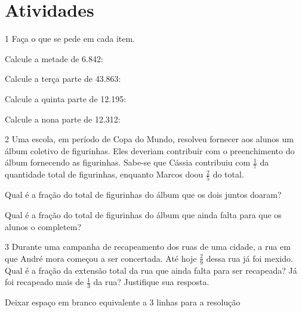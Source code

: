 \section*{Atividades}

\num{1} Faça o que se pede em cada item.

\begin{escolha}
\item
Calcule a metade de 6.842: 

\item
Calcule a terça parte de 43.863: 

\item
Calcule a quinta parte de 12.195: 

\item
Calcule a nona parte de 12.312: 

\end{escolha}

\num{2} Uma escola, em período de Copa do Mundo, resolveu fornecer aos alunos um
álbum coletivo de figurinhas. Eles deveriam contribuir com o
preenchimento do álbum fornecendo as figurinhas. Sabe-se que Cássia
contribuiu com $\frac{1}{7}$ da quantidade total de figurinhas, enquanto Marcos
doou $\frac{2}{5}$ do total.

\begin{escolha}
\item
  Qual é a fração do total de figurinhas do álbum que os dois juntos doaram?
\item{}
\bigskip

\item
  Qual é a fração do total de figurinhas do álbum que ainda falta para que os alunos o completem?
\item{}
\bigskip
\end{escolha}


\num{3} Durante uma campanha de recapeamento dos ruas de uma cidade, a rua em
que André mora começou a ser concertada. Até hoje $\frac{2}{9}$ dessa rua já foi mexido.
Qual é a fração da extensão total da rua que ainda falta para ser
recapeada? Já foi recapeado mais de $\frac{1}{3}$ da rua? Justifique sua resposta.

Deixar espaço em branco equivalente a 3 linhas para a resolução

\begin{mdframed}[linewidth=2pt,linecolor=salmao,roundcorner=2pt]

\vspace{2cm}
\end{mdframed}

